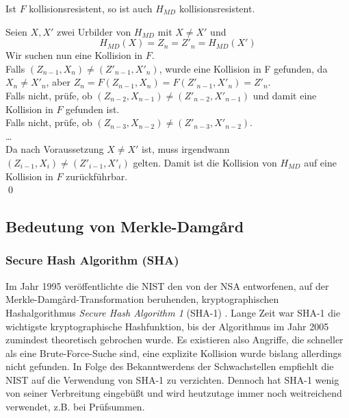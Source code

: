 \begin{theorem}
Ist $F$ kollisionsresistent, so ist auch $H_{MD}$ kollisionsresistent.\\
\end{theorem}

\begin{beweis}
Seien $X, X'$ zwei Urbilder von $H_{MD}$ mit $X \not = X'$ und
\begin{equation*}
H_{MD}(X) = Z_{n} = Z'_{n} = H_{MD}(X')
\end{equation*}
Wir suchen nun eine Kollision in $F$.\\
Falls $(Z_{n-1}, X_n) \not = (Z'_{n-1}, X'_n)$, wurde eine Kollision in F gefunden, da $X_n \not = X'_n$, aber $Z_{n} = F(Z_{n-1}, X_{n}) = F(Z'_{n-1},
X'_{n}) = Z'_{n}$.\\
Falls nicht, prüfe, ob $(Z_{n-2}, X_{n-1}) \not = (Z'_{n-2}, X'_{n-1})$ und damit eine Kollision in $F$ gefunden ist.\\
Falls nicht, prüfe, ob $(Z_{n-3}, X_{n-2}) \not = (Z'_{n-3}, X'_{n-2})$. \\
\ldots\\
Da nach Voraussetzung $X \not = X'$ ist, muss irgendwann $(Z_{i-1}, X_{i}) \not = (Z'_{i-1}, X'_{i})$ gelten. Damit ist die Kollision von $H_{MD}$ auf eine
Kollision in $F$ zurückführbar.\\
\qed
\end{beweis}

\subsection{Bedeutung von Merkle-Damgård}

\subsubsection{Secure Hash Algorithm (SHA)}
Im Jahr 1995 veröffentlichte die NIST den von der NSA entworfenen, auf der Merkle-Damgård-Transformation beruhenden, kryptographischen Hashalgorithmus \textit{Secure Hash Algorithm 1} (SHA-1) \cite{NIST_SHA95}. Lange Zeit war SHA-1 die wichtigste kryptographische Hashfunktion, bis der Algorithmus im Jahr 2005 zumindest theoretisch gebrochen wurde. Es existieren also Angriffe, die schneller als eine Brute-Force-Suche sind, eine explizite Kollision wurde bislang allerdings nicht gefunden. In Folge des Bekanntwerdens der Schwachstellen empfiehlt die NIST auf die Verwendung von SHA-1 zu verzichten. Dennoch hat SHA-1 wenig von seiner Verbreitung eingebüßt und wird heutzutage immer noch weitreichend verwendet, z.B. bei Prüfsummen.

